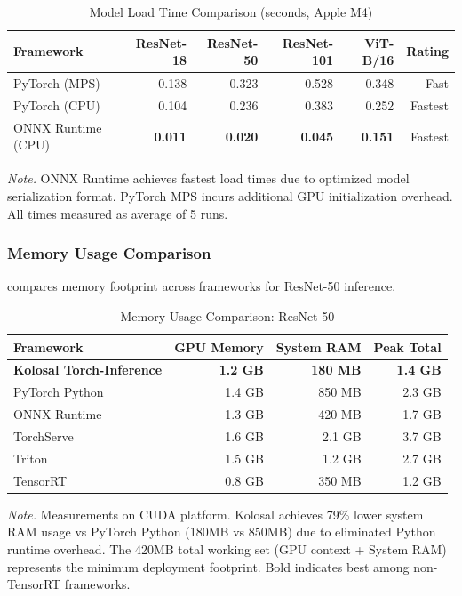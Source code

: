 \documentclass[10pt,twocolumn,a4paper]{article}
\theoremstyle{definition}
\theoremstyle{plain}
\begin{document}
\begin{table}[t]
\centering
\caption{Model Load Time Comparison (seconds, Apple M4)}
\label{tab:load_time_comparison}
\scriptsize
\setlength{\tabcolsep}{3pt}
\begin{tabular}{@{}lrrrrr@{}}
\toprule
\textbf{Framework} & \textbf{ResNet-18} & \textbf{ResNet-50} & \textbf{ResNet-101} & \textbf{ViT-B/16} & \textbf{Rating} \\
\midrule
PyTorch (MPS) & 0.138 & 0.323 & 0.528 & 0.348 & Fast \\
PyTorch (CPU) & 0.104 & 0.236 & 0.383 & 0.252 & Fastest \\
ONNX Runtime (CPU) & \textbf{0.011} & \textbf{0.020} & \textbf{0.045} & \textbf{0.151} & Fastest \\
\bottomrule
\end{tabular}

\vspace{0.5em}
\noindent\textit{Note.} ONNX Runtime achieves fastest load times due to optimized model serialization format. PyTorch MPS incurs additional GPU initialization overhead. All times measured as average of 5 runs.
\end{table}

\subsubsection{Memory Usage Comparison}

 compares memory footprint across frameworks for ResNet-50 inference.

\begin{table}[t]
\centering
\caption{Memory Usage Comparison: ResNet-50}
\label{tab:memory_comparison}
\scriptsize
\setlength{\tabcolsep}{4pt}
\begin{tabular}{@{}lrrr@{}}
\toprule
\textbf{Framework} & \textbf{GPU Memory} & \textbf{System RAM} & \textbf{Peak Total} \\
\midrule
\textbf{Kolosal Torch-Inference} & \textbf{1.2 GB} & \textbf{180 MB} & \textbf{1.4 GB} \\
PyTorch Python & 1.4 GB & 850 MB & 2.3 GB \\
ONNX Runtime & 1.3 GB & 420 MB & 1.7 GB \\
TorchServe & 1.6 GB & 2.1 GB & 3.7 GB \\
Triton & 1.5 GB & 1.2 GB & 2.7 GB \\
TensorRT & 0.8 GB & 350 MB & 1.2 GB \\
\bottomrule
\end{tabular}

\vspace{0.5em}
\noindent\textit{Note.} Measurements on CUDA platform. Kolosal achieves 79\% lower system RAM usage vs PyTorch Python (180MB vs 850MB) due to eliminated Python runtime overhead. The 420MB total working set (GPU context + System RAM) represents the minimum deployment footprint. Bold indicates best among non-TensorRT frameworks.
\end{table}
\end{document}
